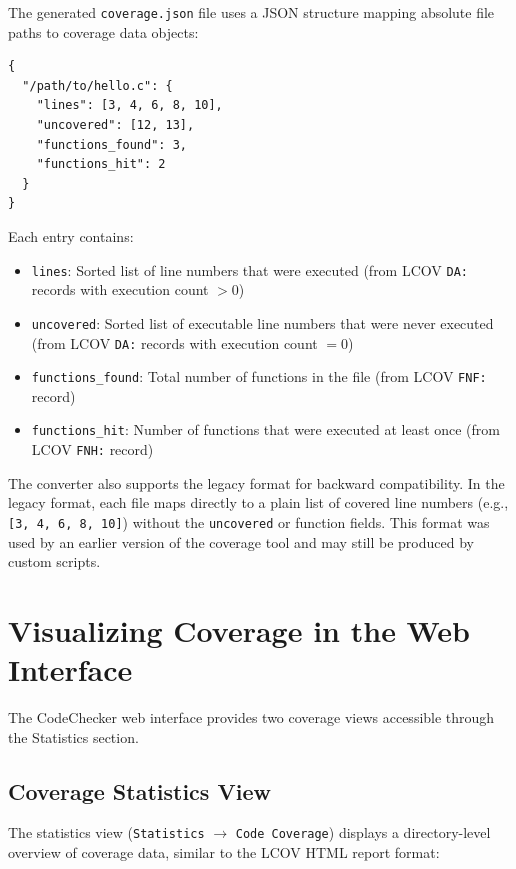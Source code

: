 The generated \texttt{coverage.json} file uses a JSON structure mapping absolute file paths to coverage data objects:

\begin{lstlisting}[caption={Example coverage.json structure}]
{
  "/path/to/hello.c": {
    "lines": [3, 4, 6, 8, 10],
    "uncovered": [12, 13],
    "functions_found": 3,
    "functions_hit": 2
  }
}
\end{lstlisting}

Each entry contains:
\begin{itemize}
    \item \texttt{lines}: Sorted list of line numbers that were executed (from LCOV \texttt{DA:} records with execution count $> 0$)
    \item \texttt{uncovered}: Sorted list of executable line numbers that were never executed (from LCOV \texttt{DA:} records with execution count $= 0$)
    \item \texttt{functions\_found}: Total number of functions in the file (from LCOV \texttt{FNF:} record)
    \item \texttt{functions\_hit}: Number of functions that were executed at least once (from LCOV \texttt{FNH:} record)
\end{itemize}

The converter also supports the legacy format for backward compatibility. In the legacy format, each file maps directly to a plain list of covered line numbers (e.g., \texttt{[3, 4, 6, 8, 10]}) without the \texttt{uncovered} or function fields. This format was used by an earlier version of the coverage tool and may still be produced by custom scripts.

\section{Visualizing Coverage in the Web Interface}

The CodeChecker web interface provides two coverage views accessible through the Statistics section.

\subsection{Coverage Statistics View}

The statistics view (\texttt{Statistics} $\rightarrow$ \texttt{Code Coverage}) displays a directory-level overview of coverage data, similar to the LCOV HTML report format:

